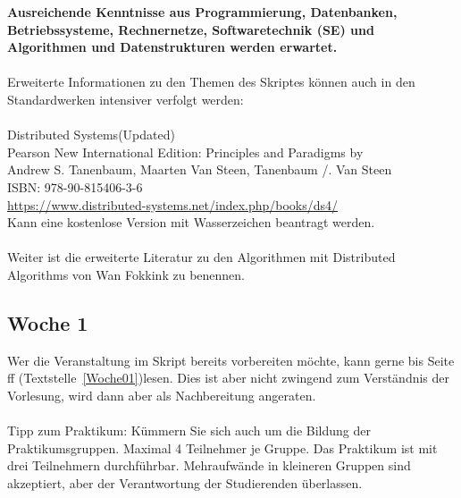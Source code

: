 \textbf{Ausreichende Kenntnisse aus Programmierung, Datenbanken, Betriebssysteme, Rechnernetze, Softwaretechnik (SE) und Algorithmen und Datenstrukturen werden erwartet.}
\\\\
Erweiterte Informationen zu den Themen des Skriptes können auch in den Standardwerken intensiver verfolgt werden:
\\\\
Distributed Systems(Updated)\\
Pearson New International Edition: Principles and Paradigms by\\
Andrew S. Tanenbaum, Maarten Van Steen, Tanenbaum /. Van Steen\\
ISBN: 978-90-815406-3-6\\
\url{https://www.distributed-systems.net/index.php/books/ds4/}\\
Kann eine kostenlose Version mit Wasserzeichen beantragt werden. 
\\\\
Weiter ist die erweiterte Literatur zu den Algorithmen mit Distributed Algorithms von Wan Fokkink \cite{Fokkink2018} zu benennen. 
\newpage
\subsection{Woche 1}
Wer die Veranstaltung im Skript bereits vorbereiten möchte, kann gerne bis Seite \pageref{Woche01}ff (Textstelle~\ref{Woche01})lesen. Dies ist aber nicht zwingend zum Verständnis der Vorlesung, wird dann aber als Nachbereitung angeraten.
\\\\
Tipp zum Praktikum: Kümmern Sie sich auch um die Bildung der Praktikumsgruppen. Maximal 4 Teilnehmer je Gruppe. Das Praktikum ist mit drei Teilnehmern durchführbar. Mehraufwände in kleineren Gruppen sind akzeptiert, aber der Verantwortung der Studierenden überlassen. 

